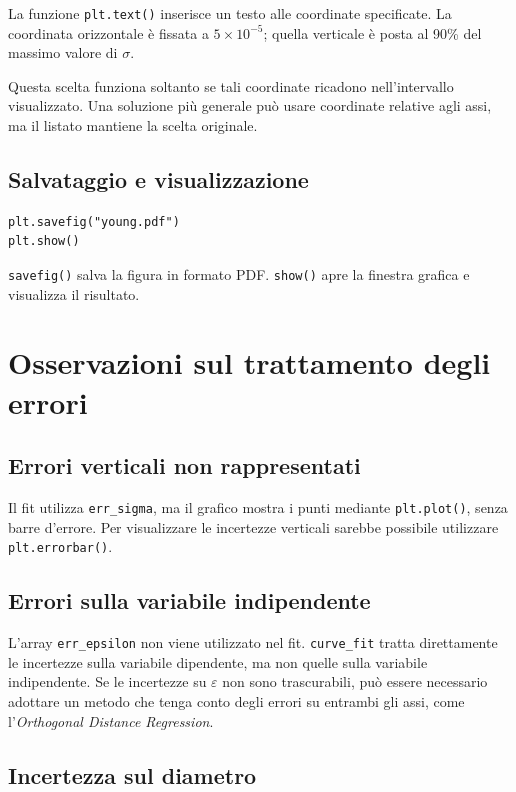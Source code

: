\documentclass[11pt,a4paper]{book}
\begin{document}
La funzione \texttt{plt.text()} inserisce un testo alle coordinate specificate. La coordinata orizzontale è fissata a $5\times10^{-5}$; quella verticale è posta al 90\% del massimo valore di $\sigma$.

Questa scelta funziona soltanto se tali coordinate ricadono nell'intervallo visualizzato. Una soluzione più generale può usare coordinate relative agli assi, ma il listato mantiene la scelta originale.

\subsection{Salvataggio e visualizzazione}

\begin{lstlisting}
plt.savefig("young.pdf")
plt.show()
\end{lstlisting}

\texttt{savefig()} salva la figura in formato PDF. \texttt{show()} apre la finestra grafica e visualizza il risultato.

\section{Osservazioni sul trattamento degli errori}

\subsection{Errori verticali non rappresentati}

Il fit utilizza \texttt{err\_sigma}, ma il grafico mostra i punti mediante \texttt{plt.plot()}, senza barre d'errore. Per visualizzare le incertezze verticali sarebbe possibile utilizzare \texttt{plt.errorbar()}.

\subsection{Errori sulla variabile indipendente}

L'array \texttt{err\_epsilon} non viene utilizzato nel fit. \texttt{curve\_fit} tratta direttamente le incertezze sulla variabile dipendente, ma non quelle sulla variabile indipendente. Se le incertezze su $\varepsilon$ non sono trascurabili, può essere necessario adottare un metodo che tenga conto degli errori su entrambi gli assi, come l'\emph{Orthogonal Distance Regression}.

\subsection{Incertezza sul diametro}
\end{document}
